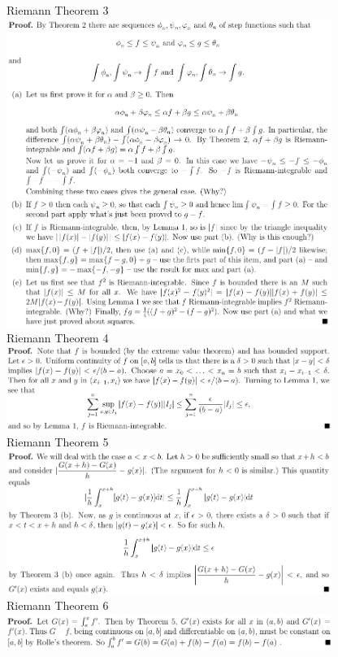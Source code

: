 \documentclass[8pt,landscape]{article}
\begin{document}
\begin{multicols}{2}
    Riemann Theorem 3
    \includegraphics[width=400]{R_t3.png} \\
    Riemann Theorem 4
    \includegraphics[width=400]{R_t4.png} \\
    Riemann Theorem 5
    \includegraphics[width=400]{R_t5.png} \\
    Riemann Theorem 6
    \includegraphics[width=400]{R_t6.png} \\

\end{multicols}
\end{document}
